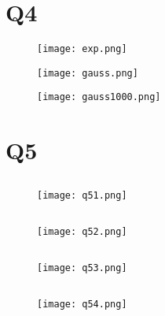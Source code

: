\documentclass[12pt]{article}
\begin{document}
\section{Q4}

\begin{figure}[H]
    \centering
    \texttt{[image: exp.png]}
\end{figure}

\begin{figure}[H]
    \centering
    \texttt{[image: gauss.png]}
\end{figure}

\begin{figure}[H]
    \centering
    \texttt{[image: gauss1000.png]}
\end{figure}

\section{Q5}
\subsection{}
\begin{figure}[H]
    \centering
    \texttt{[image: q51.png]}
\end{figure}
\subsection{}
\begin{figure}[H]
    \centering
    \texttt{[image: q52.png]}
\end{figure}
\subsection{}
\begin{figure}[H]
    \centering
    \texttt{[image: q53.png]}
\end{figure}

\subsection{}
\begin{figure}[H]
    \centering
    \texttt{[image: q54.png]}
\end{figure}
\end{document}
